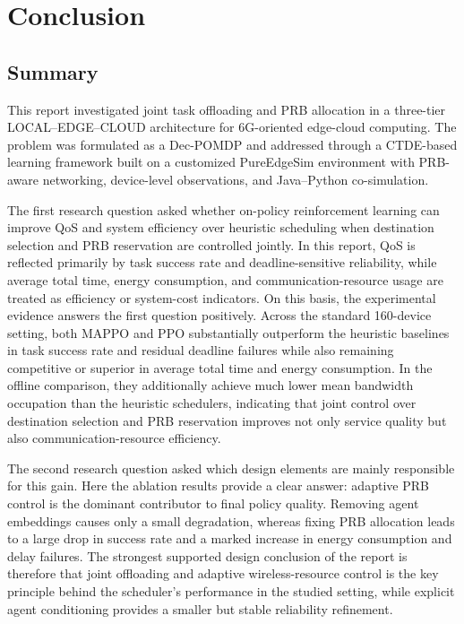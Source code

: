 \newpage
\section{Conclusion}
\label{sec:conclusion}

\subsection{Summary}
\label{subsec:conclusion-summary}

This report investigated joint task offloading and PRB allocation in a three-tier LOCAL--EDGE--CLOUD architecture for 6G-oriented edge-cloud computing. The problem was formulated as a Dec-POMDP and addressed through a CTDE-based learning framework built on a customized PureEdgeSim environment with PRB-aware networking, device-level observations, and Java--Python co-simulation.

The first research question asked whether on-policy reinforcement learning can improve QoS and system efficiency over heuristic scheduling when destination selection and PRB reservation are controlled jointly. In this report, QoS is reflected primarily by task success rate and deadline-sensitive reliability, while average total time, energy consumption, and communication-resource usage are treated as efficiency or system-cost indicators. On this basis, the experimental evidence answers the first question positively. Across the standard 160-device setting, both MAPPO and PPO substantially outperform the heuristic baselines in task success rate and residual deadline failures while also remaining competitive or superior in average total time and energy consumption. In the offline comparison, they additionally achieve much lower mean bandwidth occupation than the heuristic schedulers, indicating that joint control over destination selection and PRB reservation improves not only service quality but also communication-resource efficiency.

The second research question asked which design elements are mainly responsible for this gain. Here the ablation results provide a clear answer: adaptive PRB control is the dominant contributor to final policy quality. Removing agent embeddings causes only a small degradation, whereas fixing PRB allocation leads to a large drop in success rate and a marked increase in energy consumption and delay failures. The strongest supported design conclusion of the report is therefore that joint offloading and adaptive wireless-resource control is the key principle behind the scheduler's performance in the studied setting, while explicit agent conditioning provides a smaller but stable reliability refinement.

